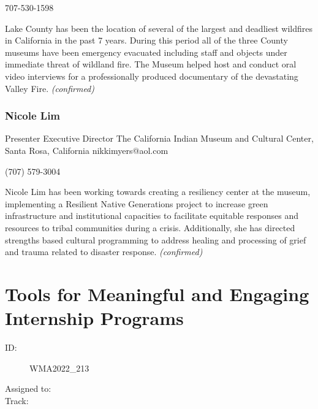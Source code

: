 \documentclass{report}
\begin{document}
                707-530-1598\newline

                Lake County has been the location of several of the largest and deadliest wildfires in California in the past 7 years. During this period all of the three County museums have been emergency evacuated including staff and objects under immediate threat of wildland fire. The Museum helped host and conduct oral video interviews for a professionally produced documentary of the devastating Valley Fire.
                \emph{ (confirmed) }
              

              
                \subsubsection*{ Nicole Lim }
                Presenter\newline
                Executive Director\newline
                  The California Indian Museum and Cultural Center, Santa Rosa, California
                \newline
                nikkimyers@aol.com\newline
                
                  (707) 579-3004\newline

                Nicole Lim has been working towards creating a resiliency center at the museum, implementing a Resilient Native Generations project to increase green infrastructure and institutional capacities to facilitate equitable responses and resources to tribal communities during a crisis. Additionally, she has directed strengths based cultural programming to address healing and processing of grief and trauma related to disaster response.
                \emph{ (confirmed) }
              

              

              
        
          \newpage
          \section{ Tools for Meaningful and Engaging Internship Programs }
            \begin{description}
              \item [ID:]
              WMA2022\_213

              \item [Assigned to:]
                \item [Track:]
              \end{description}
\end{document}
